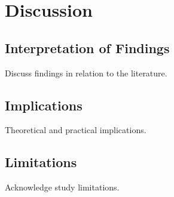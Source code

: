 \chapter{Discussion}
\label{chap:discussion}

\section{Interpretation of Findings}

Discuss findings in relation to the literature.

\section{Implications}

Theoretical and practical implications.

\section{Limitations}

Acknowledge study limitations.
